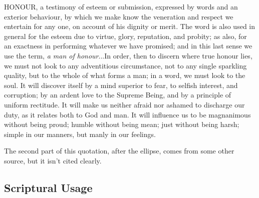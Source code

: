 	\begin{compactdesc}
		\item[462--427] HONOUR, a testimony of esteem or submission, expressed by words and an exterior behaviour, by which we make know the veneration and respect we entertain for any one, on account of his dignity or merit. The word is also used in general for the esteem due to virtue, glory, reputation, and probity; as also, for an exactness in performing whatever we have promised; and in this last sense we use the term, \textit{a man of honour}...In order, then to discern where true honour lies, we must not look to any adventitious circumstance, not to any single sparkling quality, but to the whole of what forms a man; in a word, we must look to the soul. It will discover itself by a mind superior to fear, to selfish interest, and corruption; by an ardent love to the Supreme Being, and by a principle of uniform rectitude. It will make us neither afraid nor ashamed to discharge our duty, as it relates both to God and man. It will influence us to be magnanimous without being proud; humble without being mean; just without being harsh; simple in our manners, but manly in our feelings.
			\begin{compactitem}
				\item The second part of this quotation, after the ellipse, comes from some other source, but it isn't cited clearly.
			\end{compactitem}
	\end{compactdesc}
	


\subsection{Scriptural Usage} %
	\label{HONOR-SCRIPTURES}

	
